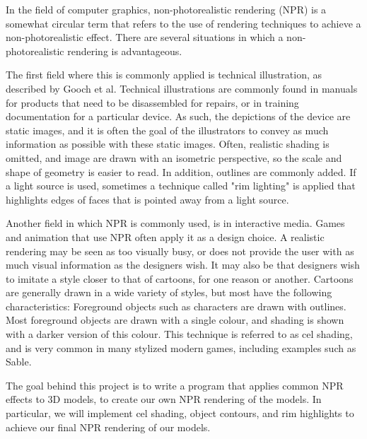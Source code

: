 In the field of computer graphics, non-photorealistic rendering (NPR) is a somewhat circular term that 
refers to the use of rendering techniques to achieve a non-photorealistic effect. There are several situations in which a non-photorealistic rendering is advantageous. 

The first field where this is commonly applied is technical illustration, as described by Gooch et al\cite{gooch98}. Technical illustrations are commonly found
in manuals for products that need to be disassembled for repairs, or in training documentation for a 
particular device. As such, the depictions of the device are static images, and it is often the goal of
the illustrators to convey as much information as possible with these static images. Often, realistic
shading is omitted, and image are drawn with an isometric perspective, so the scale and shape of 
geometry is easier to read. In addition, outlines are commonly added. If a light source is used, 
sometimes a technique called "rim lighting" is applied that highlights edges of faces that is pointed 
away from a light source.

Another field in which NPR is commonly used, is in interactive media. Games and animation that use NPR
often apply it as a design choice. A realistic rendering may be seen as
too visually busy, or does not provide the user with as much visual information as the designers wish.
It may also be that designers wish to imitate a style closer to that of cartoons, for one reason or 
another. Cartoons are generally drawn in a wide variety of styles, but most have the following 
characteristics: Foreground objects such as characters are drawn with outlines. Most foreground objects
are drawn with a single colour, and shading is shown with a darker version of this colour. This 
technique is referred to as cel shading, and is very common in many stylized modern games, including
examples such as Sable.

The goal behind this project is to write a program that applies common NPR effects to 3D models, to 
create our own NPR rendering of the models. In particular, we will implement cel shading, object 
contours, and rim highlights to achieve our final NPR rendering of our models. 

